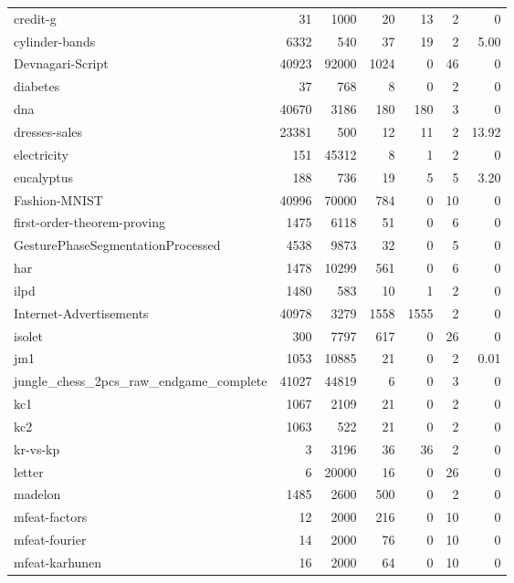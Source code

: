 {\begin{longtable}{>{\raggedright\arraybackslash}p{4.6cm}rrrrrr}
credit-g & 31 & \num{1000} & \num{20} & 13 & 2 & 0 \\
cylinder-bands & 6332 & \num{540} & \num{37} & 19 & 2 & \num{5.00} \\
Devnagari-Script & 40923 & \num{92000} & \num{1024} & 0 & 46 & 0 \\
diabetes & 37 & \num{768} & \num{8} & 0 & 2 & 0 \\
dna & 40670 & \num{3186} & \num{180} & 180 & 3 & 0 \\
dresses-sales & 23381 & \num{500} & \num{12} & 11 & 2 & \num{13.92} \\
electricity & 151 & \num{45312} & \num{8} & 1 & 2 & 0 \\
eucalyptus & 188 & \num{736} & \num{19} & 5 & 5 & \num{3.20} \\
Fashion-MNIST & 40996 & \num{70000} & \num{784} & 0 & 10 & 0 \\
first-order-theorem-proving & 1475 & \num{6118} & \num{51} & 0 & 6 & 0 \\
Gesture\allowbreak Phase\allowbreak Segmentation\allowbreak Processed & 4538 & \num{9873} & \num{32} & 0 & 5 & 0 \\
har & 1478 & \num{10299} & \num{561} & 0 & 6 & 0 \\
ilpd & 1480 & \num{583} & \num{10} & 1 & 2 & 0 \\
Internet-Advertisements & 40978 & \num{3279} & \num{1558} & 1555 & 2 & 0 \\
isolet & 300 & \num{7797} & \num{617} & 0 & 26 & 0 \\
jm1 & 1053 & \num{10885} & \num{21} & 0 & 2 & \num{0.01} \\
jungle\_\allowbreak chess\_\allowbreak 2pcs\_\allowbreak raw\_\allowbreak endgame\_\allowbreak complete & 41027 & \num{44819} & \num{6} & 0 & 3 & 0 \\
kc1 & 1067 & \num{2109} & \num{21} & 0 & 2 & 0 \\
kc2 & 1063 & \num{522} & \num{21} & 0 & 2 & 0 \\
kr-vs-kp & 3 & \num{3196} & \num{36} & 36 & 2 & 0 \\
letter & 6 & \num{20000} & \num{16} & 0 & 26 & 0 \\
madelon & 1485 & \num{2600} & \num{500} & 0 & 2 & 0 \\
mfeat-factors & 12 & \num{2000} & \num{216} & 0 & 10 & 0 \\
mfeat-fourier & 14 & \num{2000} & \num{76} & 0 & 10 & 0 \\
mfeat-karhunen & 16 & \num{2000} & \num{64} & 0 & 10 & 0 \\

\end{longtable}}
